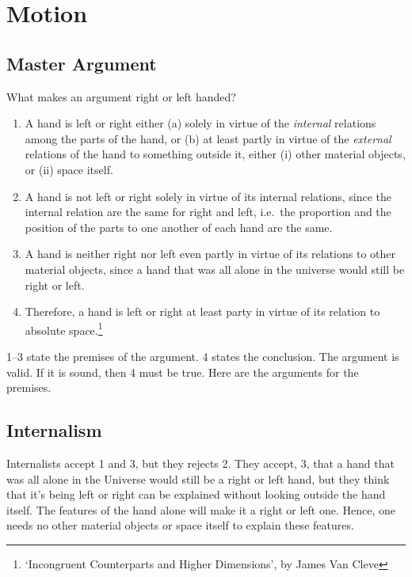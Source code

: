 \documentclass[oneside]{article}
\begin{document}
\thispagestyle{fancy}




\section{Motion}\label{motion}



\subsection{Master Argument}\label{master-argument}

What makes an argument right or left handed?

\begin{enumerate}
\def\labelenumi{\arabic{enumi}.}
\item
  A hand is left or right either (a) solely in virtue of the
  \emph{internal} relations among the parts of the hand, or (b) at least
  partly in virtue of the \emph{external} relations of the hand to
  something outside it, either (i) other material objects, or (ii) space
  itself.
\item
  A hand is not left or right solely in virtue of its internal
  relations, since the internal relation are the same for right and
  left, i.e.~the proportion and the position of the parts to one another
  of each hand are the same.
\item
  A hand is neither right nor left even partly in virtue of its
  relations to other material objects, since a hand that was all alone
  in the universe would still be right or left.
\item
  Therefore, a hand is left or right at least party in virtue of its
  relation to absolute space.\footnote{`Incongruent Counterparts and
    Higher Dimensions', by James Van Cleve}
\end{enumerate}

1--3 state the premises of the argument. 4 states the conclusion. The
argument is valid. If it is sound, then 4 must be true. Here are the
arguments for the premises.

\subsection{Internalism}\label{internalism}

Internalists accept 1 and 3, but they rejects 2. They accept, 3, that a
hand that was all alone in the Universe would still be a right or left
hand, but they think that it's being left or right can be explained
without looking outside the hand itself. The features of the hand alone
will make it a right or left one. Hence, one needs no other material
objects or space itself to explain these features.
\end{document}

